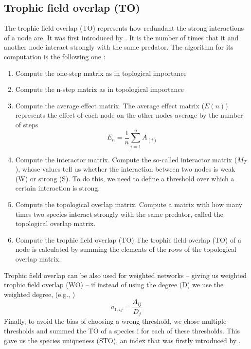 \documentclass[twocolumn]{article}
\begin{document}
	\subsection*{Trophic field overlap (TO)}
		The trophic field overlap (TO) represents how redundant the strong interactions of a node are.
		It was first  introduced by \citet{Jordan2009a}.
		It is the number of times that it and another node interact strongly with the same predator.
		The algorithm for its computation is the following one \citep{Jordan2018}:
		\begin{enumerate}
			\item Compute the one-step matrix as in toplogical importance \item Compute the n-step matrix as in topological importance \item Compute the average effect matrix.
			      The average effect matrix ($E(n)$) represents the effect of each node on the other nodes average by the number of steps
			      \begin{equation}
				      E_n=\frac{1}{n}\sum_{i=1}^{n}A_{\left(i\right)}
			      \end{equation}
			\item Compute the interactor matrix.
			      Compute the so-called interactor matrix ($M_T$), whose values tell us whether the interaction between two nodes is weak (W) or strong (S).
			      To do this, we need to define a threshold over which a certain interaction is strong.
			\item Compute the topological overlap matrix.
			      Compute a matrix with how many times two species interact strongly with the same predator, called the topological overlap matrix.
			\item Compute the trophic field overlap (TO)
			      The trophic field overlap (TO) of a node is calculated by summing the elements of the rows of the topological overlap matrix.
		\end{enumerate}
		Trophic field overlap can be also used for weighted networks – giving us weighted trophic field overlap (WO) – if instead of using the degree (D) we use the weighted degree, (e.g.,  \citet{Xiao2019})
		\begin{equation}
			a_{1,ij}=\frac{A_{ij}}{D_j}
		\end{equation}
		Finally, to avoid the bias of choosing a wrong threshold, we chose multiple thresholds and summed the TO of a species i for each of these thresholds.
		This gave us the species uniqueness (STO), an index that was firstly introduced by \citet{Lai2015}.
\end{document}
